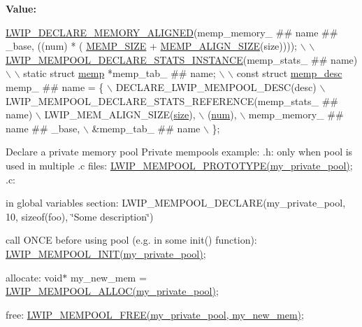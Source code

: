{\bfseries Value\+:}
\begin{DoxyCode}
\hyperlink{group__compiler__abstraction_ga651bb349041669fe717b19f127ef16c0}{LWIP\_DECLARE\_MEMORY\_ALIGNED}(memp\_memory\_ ## name ## \_base, ((num) * (
      \hyperlink{native_2lwip_2src_2include_2lwip_2priv_2memp__priv_8h_a7f8c378e0581aa2dc491cff52ae4fce2}{MEMP\_SIZE} + \hyperlink{native_2lwip_2src_2include_2lwip_2priv_2memp__priv_8h_a12e0cfbac9c8263e5a1fb319b92338e7}{MEMP\_ALIGN\_SIZE}(size)))); \hyperlink{native_2lwip_2src_2include_2lwip_2priv_2memp__priv_8h_a9373cb7cc6e658a60cec6ca57173a72d}{\(\backslash\)}
\hyperlink{native_2lwip_2src_2include_2lwip_2priv_2memp__priv_8h_a9373cb7cc6e658a60cec6ca57173a72d}{    \(\backslash\)}
\hyperlink{native_2lwip_2src_2include_2lwip_2priv_2memp__priv_8h_a9373cb7cc6e658a60cec6ca57173a72d}{  LWIP\_MEMPOOL\_DECLARE\_STATS\_INSTANCE}(memp\_stats\_ ## name) \(\backslash\)
    \(\backslash\)
  static \textcolor{keyword}{struct }\hyperlink{structmemp}{memp} *memp\_tab\_ ## name; \(\backslash\)
    \(\backslash\)
  const \textcolor{keyword}{struct }\hyperlink{structmemp__desc}{memp\_desc} memp\_ ## name = \{ \(\backslash\)
    DECLARE\_LWIP\_MEMPOOL\_DESC(desc) \(\backslash\)
    LWIP\_MEMPOOL\_DECLARE\_STATS\_REFERENCE(memp\_stats\_ ## name) \(\backslash\)
    LWIP\_MEM\_ALIGN\_SIZE(\hyperlink{structmemp__desc_a1688d2bdd5a7b77700e1fa627f025ba3}{size}), \(\backslash\)
    (\hyperlink{structmemp__desc_a2c32db78e565b8812ca0e20fe929a8a7}{num}), \(\backslash\)
    memp\_memory\_ ## name ## \_base, \(\backslash\)
    &memp\_tab\_ ## name \(\backslash\)
  \};
\end{DoxyCode}
Declare a private memory pool Private mempools example\+: .h\+: only when pool is used in multiple .c files\+: \hyperlink{group__mempool_ga92fc8c29d0e2654f2a2ecc43b2b7fb13}{L\+W\+I\+P\+\_\+\+M\+E\+M\+P\+O\+O\+L\+\_\+\+P\+R\+O\+T\+O\+T\+Y\+P\+E(my\+\_\+private\+\_\+pool)}; .c\+:
\begin{DoxyItemize}
\item in global variables section\+: L\+W\+I\+P\+\_\+\+M\+E\+M\+P\+O\+O\+L\+\_\+\+D\+E\+C\+L\+A\+RE(my\+\_\+private\+\_\+pool, 10, sizeof(foo), \char`\"{}\+Some description\char`\"{})
\item call O\+N\+CE before using pool (e.\+g. in some init() function)\+: \hyperlink{group__mempool_ga60b51c06d276f525b35d8b7abd4dcb41}{L\+W\+I\+P\+\_\+\+M\+E\+M\+P\+O\+O\+L\+\_\+\+I\+N\+I\+T(my\+\_\+private\+\_\+pool)};
\item allocate\+: void$\ast$ my\+\_\+new\+\_\+mem = \hyperlink{group__mempool_ga5e2498f6c17746c1fe7153de5f7f275a}{L\+W\+I\+P\+\_\+\+M\+E\+M\+P\+O\+O\+L\+\_\+\+A\+L\+L\+O\+C(my\+\_\+private\+\_\+pool)};
\item free\+: \hyperlink{group__mempool_gaa43d114dd702fbd8f1db18474ea93a04}{L\+W\+I\+P\+\_\+\+M\+E\+M\+P\+O\+O\+L\+\_\+\+F\+R\+E\+E(my\+\_\+private\+\_\+pool, my\+\_\+new\+\_\+mem)};
\end{DoxyItemize}

